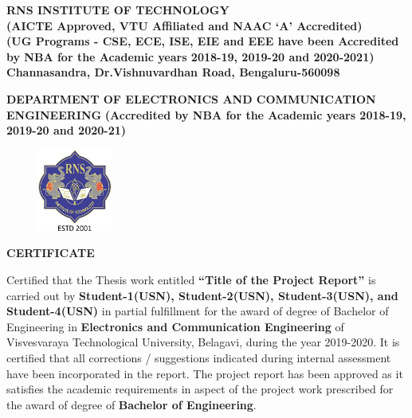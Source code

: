 \setlength{\toptafiddle}{1in}
\setlength{\bottafiddle}{1in}
\vspace*{-0.5in}
\enlargethispage{\bottafiddle}
\thispagestyle{empty}


\begin{center}
	\large\textbf{RNS INSTITUTE OF TECHNOLOGY}\\
	\small\textbf{(AICTE Approved, VTU Affiliated and NAAC `A' Accredited)\\
		(UG Programs - CSE, ECE, ISE, EIE and EEE have been Accredited by NBA for the Academic years 2018-19, 2019-20 and 2020-2021)\\
		Channasandra, Dr.Vishnuvardhan Road, Bengaluru-560098}\\
\end{center}
\begin{center}
	\footnotesize\textbf{DEPARTMENT OF ELECTRONICS AND COMMUNICATION ENGINEERING}
	\small\textbf{(Accredited by NBA for the Academic years 2018-19, 2019-20 and 2020-21)}	
\end{center}

\begin{center}
\begin{figure}[h]
\centering
\includegraphics[height=2.7cm]{images/rns1.jpg}
\end{figure}
\Large{\textbf{CERTIFICATE}}
\end{center}

Certified that the Thesis work entitled \textbf{``Title of the Project Report''} is carried out by \textbf{Student-1(USN), Student-2(USN), Student-3(USN), and Student-4(USN)} in partial fulfillment for the award of degree of Bachelor of Engineering in \textbf{\color{blue}Electronics and Communication Engineering} of Visvesvaraya Technological University, Belagavi, during the year 2019-2020. It is certified that all corrections / suggestions indicated during internal assessment have been incorporated in the report. The project report has been approved as it satisfies the academic requirements in aspect of the project work prescribed for the award of degree of \textbf{\color{blue}Bachelor of Engineering}.


